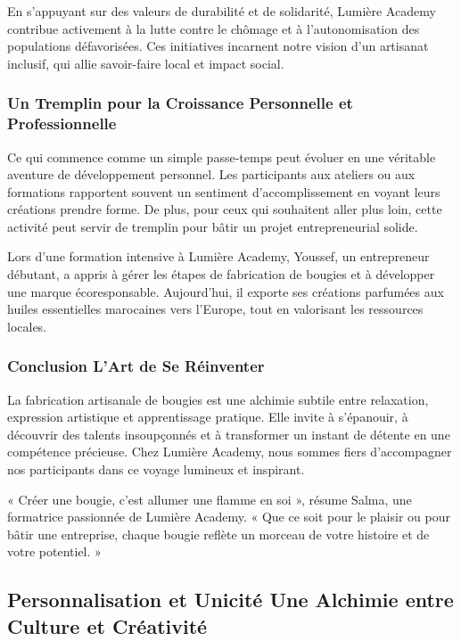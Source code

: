 \documentclass[11pt,fleqn,onecolumn,oneside]{book}
\begin{document}
En s’appuyant sur des valeurs de durabilité et de solidarité, Lumière Academy contribue activement à la lutte contre le chômage et à l’autonomisation des populations défavorisées. Ces initiatives incarnent notre vision d’un artisanat inclusif, qui allie savoir-faire local et impact social.

\subsubsection*{Un Tremplin pour la Croissance Personnelle et Professionnelle}

Ce qui commence comme un simple passe-temps peut évoluer en une véritable aventure de développement personnel. Les participants aux ateliers ou aux formations rapportent souvent un sentiment d’accomplissement en voyant leurs créations prendre forme. De plus, pour ceux qui souhaitent aller plus loin, cette activité peut servir de tremplin pour bâtir un projet entrepreneurial solide.

\begin{example}
Lors d’une formation intensive à Lumière Academy, Youssef, un entrepreneur débutant, a appris à gérer les étapes de fabrication de bougies et à développer une marque écoresponsable. Aujourd’hui, il exporte ses créations parfumées aux huiles essentielles marocaines vers l’Europe, tout en valorisant les ressources locales.
\end{example}

\subsubsection*{Conclusion L'Art de Se Réinventer}

La fabrication artisanale de bougies est une alchimie subtile entre relaxation, expression artistique et apprentissage pratique. Elle invite à s’épanouir, à découvrir des talents insoupçonnés et à transformer un instant de détente en une compétence précieuse. Chez Lumière Academy, nous sommes fiers d’accompagner nos participants dans ce voyage lumineux et inspirant.

\begin{remark}
« Créer une bougie, c’est allumer une flamme en soi », résume Salma, une formatrice passionnée de Lumière Academy. « Que ce soit pour le plaisir ou pour bâtir une entreprise, chaque bougie reflète un morceau de votre histoire et de votre potentiel. »
\end{remark}

\subsection*{Personnalisation et Unicité Une Alchimie entre Culture et Créativité}
\end{document}
